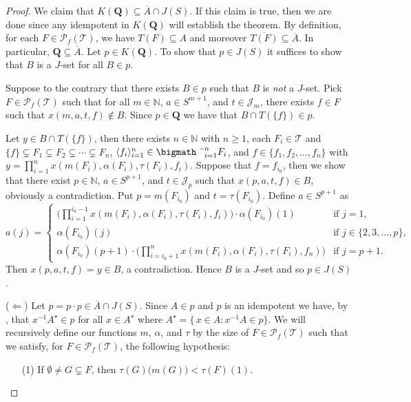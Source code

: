 \documentclass[12pt]{article}
\theoremstyle{plain}
\theoremstyle{definition}
\newcommand{\la}{\langle}
\newcommand{\ra}{\rangle}
\newcommand{\bbN}{\mathbb{N}}
\newcommand{\calJ}{\mathcal{J}}
\newcommand{\calT}{\mathcal{T}}
\newcommand{\Pf}{\mathcal{P}_f}
\newcommand{\bigtimes}{\hbox{\bigmath \char'2}}
\begin{document}
\begin{proof}
  We claim that $K(\mathbf{Q}) \subseteq \overline{A} \cap J(S)$. 
  If this claim is true, then we are done since any idempotent in $K(\mathbf{Q})$ will establish the theorem. 
  By definition, for each $F \in \Pf(\calT)$, we have $T(F) \subseteq A$ and moreover $\overline{T(F)} \subseteq \overline{A}$.
  In particular, $\mathbf{Q} \subseteq \overline{A}$. 
  Let $p \in K(\mathbf{Q})$.
  To show that $p \in J(S)$ it suffices to show that $B$ is a $J$-set for all $B \in p$. 

  Suppose to the contrary that there exists $B \in p$ such that $B$ is \textsl{not} a $J$-set. 
  Pick $F \in \Pf(\calT)$ such that for all $m \in \bbN$, $a \in S^{m+1}$, and $t \in \calJ_m$, there exists $f \in F$ such that $x(m, a, t, f) \not\in B$. 
  Since $p \in \mathbf{Q}$ we have that $B \cap T(\{f\}) \in p$. 
  
  Let $y \in B \cap T(\{f\})$, then there exists $n \in \bbN$ with $n \ge 1$, each $F_i \in \calT$ and $\{f\} \subsetneq F_1 \subsetneq F_2 \subsetneq \cdots \subsetneq F_n$, $\la f_i \ra_{i=1}^n \in \bigtimes_{i=1}^n F_i$, and $f \in \{f_1, f_2, \ldots, f_n\}$ with $y = \prod_{i=1}^n x(m(F_i), \alpha(F_i), \tau(F_i), f_i)$.
  Suppose that $f = f_{i_0}$, then we show that there exist $p \in \bbN$, $a \in S^{p+1}$, and $t \in \calJ_p$ such that $x(p, a, t, f) \in B$, obviously a contradiction. 
  Put $p = m(F_{i_0})$ and $t = \tau(F_{i_0})$. 
  Define $a \in S^{p+1}$ as
  \[
    a(j) =
    \begin{cases}
      \bigl( \prod_{i=1}^{i_0-1} x(m(F_i), \alpha(F_i), \tau(F_i), f_i) \bigr) \cdot \alpha(F_{i_0})(1) & \mbox{if $j = 1$,} \\
      \alpha(F_{i_0})(j) & \mbox{if $j \in \{2, 3, \ldots, p\}$,} \\
      \alpha(F_{i_0})(p+1) \cdot \bigl( \prod_{i=i_0+1}^n x(m(F_i), \alpha(F_i), \tau(F_i), f_n) \bigr) & \mbox{if $j = p+1$.}
    \end{cases}
  \]
  Then $x(p, a, t, f) = y \in B$, a contradiction.
  Hence $B$ is a $J$-set and so $p \in J(S)$.

  ($\Leftarrow$)
  Let $p = p \cdot p \in \overline{A} \cap J(S)$.
  Since $A \in p$ and $p$ is an idempotent we have, by \cite[Lemma 4.14]{Hindman:1998fk}, that $x^{-1}A^\star \in p$ for all $x \in A^\star$ where $A^\star = \{\, x \in A : x^{-1}A \in p\}$. 
  We will recursively define our functions $m$, $\alpha$, and $\tau$ by the size of $F \in \Pf(\calT)$ such that we satisfy, for $F \in \Pf(\calT)$, the following hypothesis:
  \begin{itemize}
    \item[(1)] If $\emptyset \ne G \subsetneq F$, then $\tau(G)\bigl( m(G) \bigr) < \tau(F)(1)$.
    

\end{itemize}
\end{proof}
\end{document}
